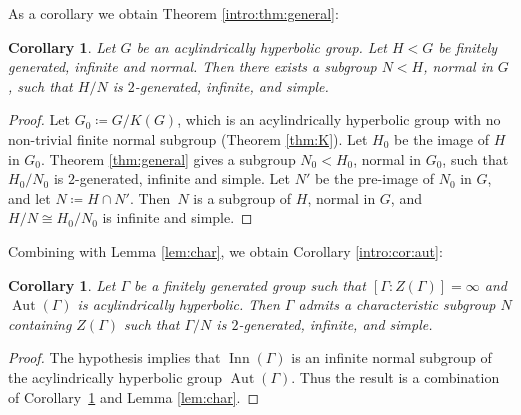 \documentclass[JEP,XML,SOM,Unicode]{cedram}
\newtheorem{corollary}[theorem]{Corollary}
\theoremstyle{definition}
\newcommand{\Aut}{\operatorname{Aut}}
\newcommand{\Inn}{\operatorname{Inn}}
\begin{document}
As a corollary we obtain Theorem \ref{intro:thm:general}:

\begin{corollary}
\label{cor:general}
Let $G$ be an acylindrically hyperbolic group. Let $H < G$ be finitely generated, infinite and normal. Then there exists a subgroup $N < H$, normal in $G$, such that $H/N$ is $2$-generated, infinite, and simple.
\end{corollary}

\begin{proof}
Let $G_0 \coloneqq G/K(G)$, which is an acylindrically hyperbolic group with no non-trivial finite normal subgroup (Theorem \ref{thm:K}).
Let $H_0$ be the image of $H$ in $G_0$.
Theorem \ref{thm:general} gives a subgroup $N_0 < H_0$, normal in $G_0$, such that $H_0 / N_0$ is $2$-generated, infinite and simple.
Let $N'$ be the pre-image of $N_0$ in $G$, and let $N \coloneqq H \cap N'$.
Then~$N$ is a subgroup of $H$, normal in $G$, and $H/N \cong H_0 / N_0$ is infinite and simple.
\end{proof}

Combining with Lemma \ref{lem:char}, we obtain Corollary \ref{intro:cor:aut}:

\begin{corollary}
\label{cor:aut}
Let $\Gamma$ be a finitely generated group such that $[\Gamma : Z(\Gamma)] = \infty$ and $\Aut(\Gamma)$ is acylindrically hyperbolic.
Then $\Gamma$ admits a characteristic subgroup $N$ containing $Z(\Gamma)$ such that $\Gamma / N$ is $2$-generated, infinite, and simple.
\end{corollary}

\begin{proof}
The hypothesis implies that $\Inn(\Gamma)$ is an infinite normal subgroup of the acylindrically hyperbolic group $\Aut(\Gamma)$. Thus the result is a combination of Corollary~\ref{cor:general} and Lemma \ref{lem:char}.
\end{proof}
\end{document}

